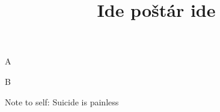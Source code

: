 \documentclass[timestamp]{jazzgrid}
\title{Ide poštár ide}
\begin{document}
\maketitle
\begin{musicsection}{A}
\barline
	{}
	{}
	{}
	{\barfour{}{          }{}{}{}}
\barline
	{}
	{}
	{}
	{}
\end{musicsection}

\begin{musicsection}{B}
\barline
	{}
	{}
	{}
	{}
\barline
	{}
	{}
	{}
	{}
\barline
	{}
	{}
	{}
	{\barfour{}{}{}{}{}}
\end{musicsection}

\begin{multicols*}{2}
\begin{description}[noitemsep,align=right,labelwidth=\widthof{\scriptsize\bfseries{ABB}}]
	\scriptsize
	\item [ABB]
	\item [ABB]
	\item
	\item Note to self: Suicide is painless
\end{description}
\end{multicols*}
\end{document}
